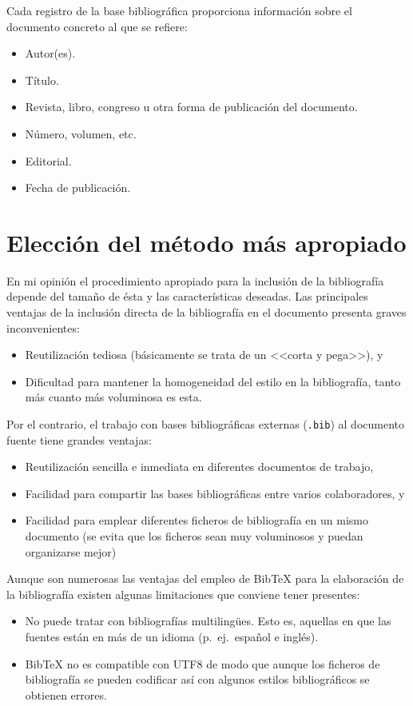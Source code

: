 \documentclass[ 		%
	11pt,				%
	a4paper,			%
	twoside,			%
	openright,			%
	final       		%
]{book}
\begin{document}
Cada registro de la base bibliográfica proporciona información sobre el documento concreto al que se refiere:
\begin{itemize}[noitemsep]
	\item Autor(es).
	\item Título.
	\item Revista, libro, congreso u otra forma de publicación del documento.
	\item Número, volumen, etc.
	\item Editorial.
	\item Fecha de publicación.
\end{itemize}



\section{Elección del método más apropiado}
En mi opinión el procedimiento apropiado para la inclusión de la bibliografía depende del tamaño de ésta y las características deseadas. Las principales ventajas de la inclusión directa de la bibliografía en el documento presenta graves inconvenientes: 
\begin{itemize}
	\item Reutilización tediosa (básicamente se trata de un <<corta y pega>>), y
	\item Dificultad para mantener la homogeneidad del estilo en la bibliografía, tanto más cuanto más voluminosa es esta.
\end{itemize}

Por el contrario, el trabajo con bases bibliográficas externas (\texttt{.bib}) al documento fuente tiene grandes ventajas:
\begin{itemize}
	\item Reutilización sencilla e inmediata en diferentes documentos de trabajo,
	\item Facilidad para compartir las bases bibliográficas entre varios colaboradores, y
	\item Facilidad para emplear diferentes ficheros de bibliografía en un mismo documento (se evita que los ficheros sean muy voluminosos y puedan organizarse mejor)
\end{itemize}

Aunque son numerosas las ventajas del empleo de Bib\TeX{} para la elaboración de la bibliografía existen algunas limitaciones que conviene tener presentes:
\begin{itemize}
	\item No puede tratar con bibliografías multilingües. Esto es, aquellas en que las fuentes están en más de un idioma (p.~ej.\ español e inglés).
	
	\item Bib\TeX{} no es compatible con UTF8 de modo que aunque los ficheros de bibliografía se pueden codificar así con algunos estilos bibliográficos se obtienen errores.
\end{itemize}
\end{document}
